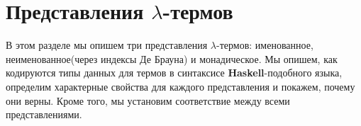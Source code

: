 \section{Представления \texorpdfstring{$\lambda$}{лямбда}-термов}

В этом разделе мы опишем три представления $\lambda$-термов: именованное, неименованное(через индексы Де Брауна) и монадическое. Мы опишем, как кодируются типы данных для термов в синтаксисе \textbf{Haskell}-подобного языка, определим характерные свойства для каждого представления и покажем, почему они верны. Кроме того, мы установим соответствие между всеми представлениями.





